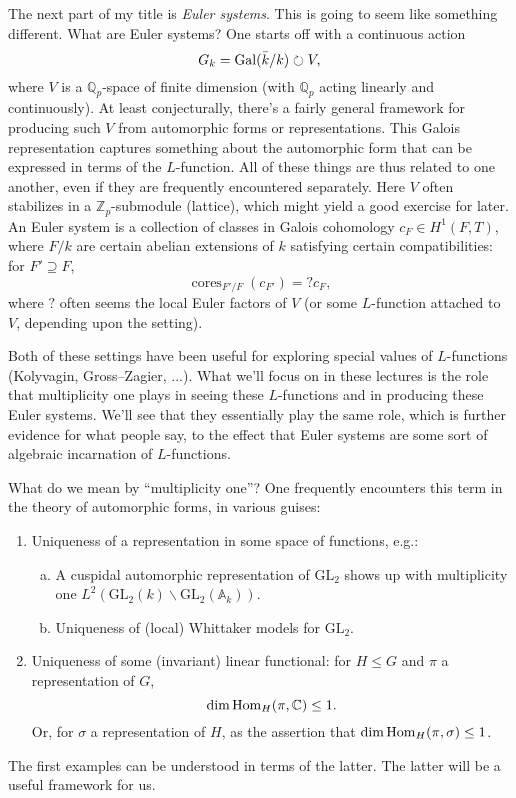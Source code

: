 \documentclass[reqno]{amsart} 
\begin{document}
The next part of my title is \emph{Euler systems}.  This is going to seem like something different.  What are Euler systems?  One starts off with a continuous action
\begin{equation*}
  G_k = \operatorname{Gal}(\bar{k} / k) \circlearrowright V,
\end{equation*}
where $V$ is a $\mathbb{Q}_p$-space of finite dimension (with $\mathbb{Q}_p$ acting linearly and continuously).  At least conjecturally, there's a fairly general framework for producing such $V$ from automorphic forms or representations.  This Galois representation captures something about the automorphic form that can be expressed in terms of the $L$-function.  All of these things are thus related to one another, even if they are frequently encountered separately.  Here $V$ often stabilizes in a $\mathbb{Z}_p$-submodule (lattice), which might yield a good exercise for later.  An Euler system is a collection of classes in Galois cohomology $c_F \in H^1(F, T)$, where $F / k$ are certain abelian extensions of $k$ satisfying certain compatibilities: for $F' \supseteq F$,
\begin{equation*}
  \operatorname{cores}_{F' / F}(c_{F '}) = ? c_F,
\end{equation*}
where $?$ often seems the local Euler factors of $V$ (or some $L$-function attached to $V$, depending upon the setting).

Both of these settings have been useful for exploring special values of $L$-functions (Kolyvagin, Gross--Zagier, ...).  What we'll focus on in these lectures is the role that multiplicity one plays in seeing these $L$-functions and in producing these Euler systems.  We'll see that they essentially play the same role, which is further evidence for what people say, to the effect that Euler systems are some sort of algebraic incarnation of $L$-functions.

What do we mean by ``multiplicity one''?  One frequently encounters this term in the theory of automorphic forms, in various guises:
\begin{enumerate}
\item\label{enumerate:cq6r3ndbhy} Uniqueness of a representation in some space of functions, e.g.:
  \begin{enumerate}[(a)]
  \item\label{enumerate:cq6r3m96yd} A cuspidal automorphic representation of $\mathrm{GL}_2$ shows up with multiplicity one $L^2(\mathrm{GL}_2(k) \backslash \mathrm{GL}_2(\mathbb{A}_k))$.
  \item\label{enumerate:cq6r3m98gf} Uniqueness of (local) Whittaker models for $\mathrm{GL}_2$.
  \end{enumerate}
\item\label{enumerate:cq6r3ndama} Uniqueness of some (invariant) linear functional: for $H \leq G$ and $\pi$ a representation of $G$,
  \begin{equation*}
    \dim \operatorname{Hom}_H(\pi, \mathbb{C}) \leq 1.
  \end{equation*}
  Or, for $\sigma$ a representation of $H$, as the assertion that $\dim \operatorname{Hom}_H(\pi, \sigma) \leq 1$.
\end{enumerate}
The first examples can be understood in terms of the latter.  The latter will be a useful framework for us.
\end{document}
